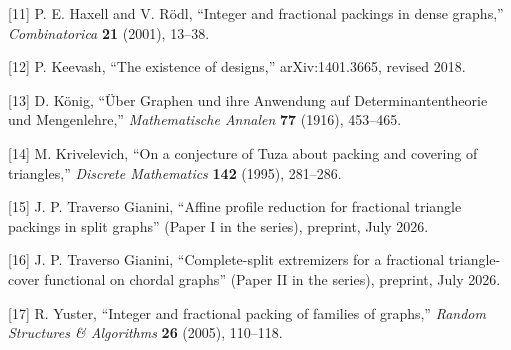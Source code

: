 \documentclass[english,11pt,a4paper]{article}
\begin{document}
{[}11{]} P. E. Haxell and V. Rödl, ``Integer and fractional packings in
dense graphs,'' \emph{Combinatorica} \textbf{21} (2001), 13--38.

{[}12{]} P. Keevash, ``The existence of designs,'' arXiv:1401.3665,
revised 2018.

{[}13{]} D. König, ``Über Graphen und ihre Anwendung auf
Determinantentheorie und Mengenlehre,'' \emph{Mathematische Annalen}
\textbf{77} (1916), 453--465.

{[}14{]} M. Krivelevich, ``On a conjecture of Tuza about packing and
covering of triangles,'' \emph{Discrete Mathematics} \textbf{142}
(1995), 281--286.

{[}15{]} J. P. Traverso Gianini, ``Affine profile reduction for
fractional triangle packings in split graphs'' (Paper I in the series),
preprint, July 2026.

{[}16{]} J. P. Traverso Gianini, ``Complete-split extremizers for a
fractional triangle-cover functional on chordal graphs'' (Paper II in
the series), preprint, July 2026.

{[}17{]} R. Yuster, ``Integer and fractional packing of families of
graphs,'' \emph{Random Structures \& Algorithms} \textbf{26} (2005),
110--118.
\end{document}
